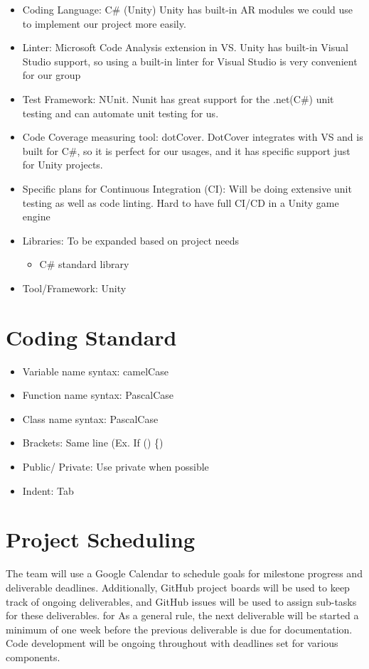 \documentclass{article}
\begin{document}
\begin{itemize}
\item Coding Language: C\# (Unity) Unity has built-in AR modules we could use to implement our project more easily. 
\item Linter: Microsoft Code Analysis extension in VS. Unity has built-in Visual Studio support, so using a built-in linter for Visual Studio is very convenient for our group
\item Test Framework: NUnit. Nunit has great support for the .net(C\#) unit testing and can automate unit testing for us. 
\item Code Coverage measuring tool: dotCover. DotCover integrates with VS and is built for C\#, so it is perfect for our usages, and it has specific support just for Unity projects. 
\item Specific plans for Continuous Integration (CI): Will be doing extensive unit testing as well as code linting. Hard to have full CI/CD in a Unity game engine
\item Libraries: To be expanded based on project needs
    \begin{itemize}
    \item C\# standard library
    \end{itemize}
\item Tool/Framework: Unity
\end{itemize}

\section{Coding Standard}
\begin{itemize}
    \item Variable name syntax: camelCase
    \item Function name syntax: PascalCase
    \item Class name syntax: PascalCase
    \item Brackets: Same line (Ex. If () \{)
    \item Public/ Private: Use private when possible
    \item Indent: Tab 
\end{itemize}

\section{Project Scheduling}

The team will use a Google Calendar to schedule goals for milestone progress and deliverable deadlines. Additionally, GitHub project boards will be used to keep track of ongoing deliverables, and GitHub issues will be used to assign sub-tasks for these deliverables. for As a general rule, the next deliverable will be started a minimum of one week before the previous deliverable is due for documentation. Code development will be ongoing throughout with deadlines set for various components. 
\end{document}
